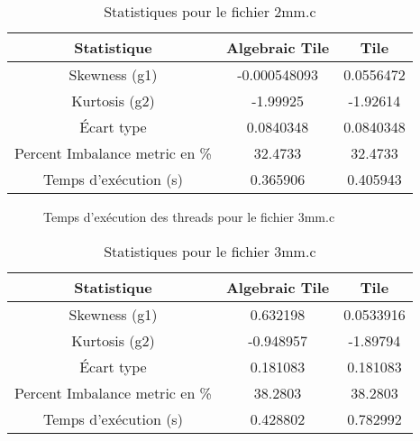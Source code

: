 \documentclass{article}
\begin{document}
\begin{table}[htbp]
  \centering
  \caption{Statistiques pour le fichier 2mm.c}
  \begin{tabular}{|c|c|c|}
    \hline
    Statistique & Algebraic Tile & Tile \\ 
    \hline
    Skewness (g1) & -0.000548093 & 0.0556472 \\ 
    Kurtosis (g2) & -1.99925 & -1.92614 \\ 
    Écart type & 0.0840348 & 0.0840348 \\ 
    Percent Imbalance metric en \% & 32.4733 & 32.4733 \\ 
    Temps d'exécution (s) &  0.365906      &  0.405943    \\ 
    \hline
  \end{tabular}
\end{table}
\newpage

\begin{figure}
  \centering
  \caption{Temps d'exécution des threads pour le fichier 3mm.c}
  \label{fig:3mm.c}
\end{figure}

\begin{table}[htbp]
  \centering
  \caption{Statistiques pour le fichier 3mm.c}
  \begin{tabular}{|c|c|c|}
    \hline
    Statistique & Algebraic Tile & Tile \\ 
    \hline
    Skewness (g1) & 0.632198 & 0.0533916 \\ 
    Kurtosis (g2) & -0.948957 & -1.89794 \\ 
    Écart type & 0.181083 & 0.181083 \\ 
    Percent Imbalance metric en \% & 38.2803 & 38.2803 \\ 
    Temps d'exécution (s) &  0.428802      &  0.782992    \\ 
    \hline
  \end{tabular}
\end{table}
\newpage
\end{document}
